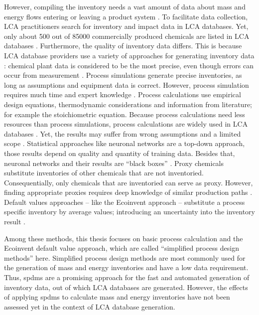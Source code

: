 However, compiling the inventory needs a vast amount of data about mass and energy flows entering or leaving a product system  \cite{InternationalOrganizationforStandardization.2006}. To facilitate data collection, \ac{LCA} practitioners search for inventory  and impact data in \ac{LCA} databases. Yet, only about 500 out of 85000 commercially produced chemicals are listed in LCA databases \cite{Parvatker.2019}. Furthermore, the quality of inventory data differs. This is because \ac{LCA} database providers use a variety of approaches for generating inventory data  \cite{Hischier.2005, Parvatker.2019}: chemical plant data is considered to be the most precise, even though errors can occur from measurement  \cite{Parvatker.2019}. Process simulations generate precise inventories, as long as assumptions and equipment data is correct. However, process simulation requires much time and expert knowledge \cite{Parvatker.2019}. Process calculations use empirical design equations, thermodynamic considerations and information from literature; for example the stoichiometric equation. Because process calculations need less resources than process simulations, process calculations are widely used in LCA databases \cite{Althaus.2007}. Yet, the results may suffer from wrong assumptions and a limited scope  \cite{Parvatker.2019}. Statistical approaches like neuronal networks are a top-down approach, those results depend on quality and quantity of training data. Besides that, neuronal networks and their results are ``black boxes'' \cite{Parvatker.2019}. Proxy chemicals substitute inventories of other chemicals that are not inventoried. Consequentially, only chemicals that are inventoried can serve as proxy. However, finding appropriate proxies requires deep knowledge of similar production paths \cite{Parvatker.2019}. Default values approaches -- like the Ecoinvent approach -- substitute a process specific inventory by average values; introducing an uncertainty into the inventory result \cite{Hischier.2005}. 

Among these methods, this thesis focuses on basic process calculation and the Ecoinvent default value approach, which are called ``simplified process design methods'' here. Simplified process design methods are most commonly used for the generation of mass and energy inventories \cite{Parvatker.2019,Hischier.2005,Althaus.2007} and have a low data requirement. Thus, \aclp{spdm} are a promising approach for the fast and automated generation of inventory data, out of which \ac{LCA} databases are generated. However, the effects of applying \acl{spdm}s to calculate mass and energy inventories have not been assessed yet in the context of LCA database generation.

